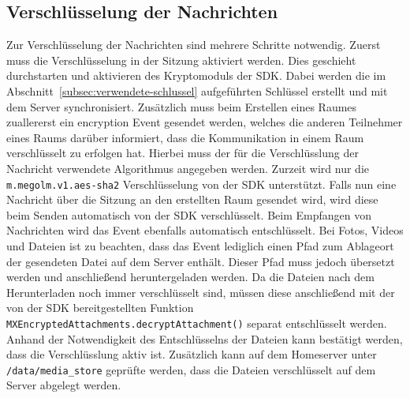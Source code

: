     \subsection{Verschlüsselung der Nachrichten}\label{subsec:verschlusselung-der-nachrichten}
    Zur Verschlüsselung der Nachrichten sind mehrere Schritte notwendig.
    Zuerst muss die Verschlüsselung in der Sitzung aktiviert werden.
    Dies geschieht durchstarten und aktivieren des Kryptomoduls der SDK.
    Dabei werden die im Abschnitt~\ref{subsec:verwendete-schlussel} aufgeführten Schlüssel erstellt und mit dem Server synchronisiert.
    Zusätzlich muss beim Erstellen eines Raumes zuallererst ein encryption Event gesendet werden, welches die anderen Teilnehmer eines Raums darüber informiert, dass die Kommunikation in einem Raum verschlüsselt zu erfolgen hat.
    Hierbei muss der für die Verschlüsslung der Nachricht verwendete Algorithmus angegeben werden.
    Zurzeit wird nur die \texttt{m.megolm.v1.aes-sha2} Verschlüsselung von der SDK unterstützt.
    Falls nun eine Nachricht über die Sitzung an den erstellten Raum gesendet wird, wird diese beim Senden automatisch von der SDK verschlüsselt.
    Beim Empfangen von Nachrichten wird das Event ebenfalls automatisch entschlüsselt.
    Bei Fotos, Videos und Dateien ist zu beachten, dass das Event lediglich einen Pfad zum Ablageort der gesendeten Datei auf dem Server enthält.
    Dieser Pfad muss jedoch übersetzt werden und anschließend heruntergeladen werden.
    Da die Dateien nach dem Herunterladen noch immer verschlüsselt sind, müssen diese anschließend mit der von der SDK bereitgestellten Funktion \texttt{MXEncryptedAttachments.decryptAttachment()} separat entschlüsselt werden.
    Anhand der Notwendigkeit des Entschlüsselns der Dateien kann bestätigt werden, dass die Verschlüsslung aktiv ist.
    Zusätzlich kann auf dem Homeserver unter \texttt{/data/media\_store} geprüfte werden, dass die Dateien verschlüsselt auf dem Server abgelegt werden.

